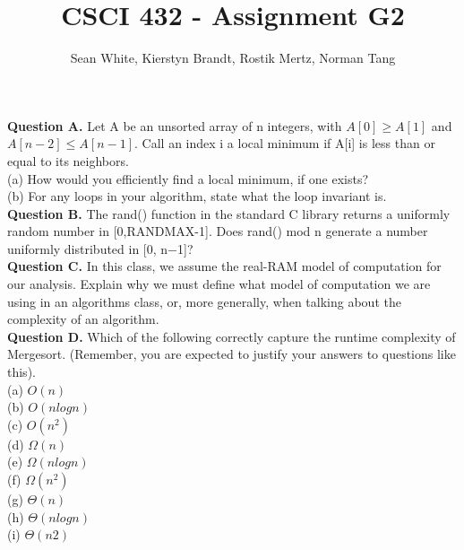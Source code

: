 \documentclass[12pt]{article}
\author{Sean White, Kierstyn Brandt, Rostik Mertz, Norman Tang}
\title{CSCI 432 - Assignment G2}
\begin{document}
\maketitle

\textbf{Question A.} Let A be an unsorted array of n integers, with $A[0] \geq A[1]$ and $A[n - 2] \leq A[n - 1]$. Call an index i a local minimum if A[i] is less than or equal to its neighbors.\\

(a) How would you efficiently find a local minimum, if one exists?\\

(b) For any loops in your algorithm, state what the loop invariant is.\\

\textbf{Question B.} The rand() function in the standard C library returns a uniformly random number in [0,RANDMAX-1]. Does rand() mod n generate a number uniformly distributed in [0, n−1]?\\

\textbf{Question C.} In this class, we assume the real-RAM model of computation for our analysis. Explain why we must define what model of computation we are using in an algorithms class, or, more generally, when talking about the complexity of an algorithm.\\

\textbf{Question D.} Which of the following correctly capture the runtime complexity of Mergesort. (Remember, you are expected to justify your answers to questions like this).\\

(a) $O(n)$\\

(b) $O(n log n)$\\

(c) $O(n^2)$\\

(d) $\Omega(n)$\\

(e) $\Omega(n log n)$\\

(f) $\Omega(n^2)$\\

(g) $\Theta(n)$\\

(h) $\Theta(n log n)$\\

(i) $\Theta(n 2)$\\
\end{document}
